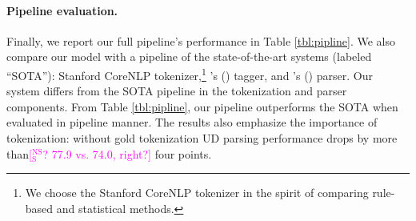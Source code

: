 \documentclass[11pt,a4paper]{article}
\newcommand{\citeposs}[2][]{\citeauthor{#2}'s (\citeyear[#1]{#2})}
\newcommand{\nss}[1]{\textcolor{magenta}{[$_\mathrm{S}^\mathrm{NS}$#1]}}
\begin{document}
\paragraph{Pipeline evaluation.} Finally, we report  our full
pipeline's performance in  Table \ref{tbl:pipline}. We also compare
our model with a pipeline of the state-of-the-art systems (labeled  ``SOTA''):
Stanford CoreNLP tokenizer,\footnote{We choose the Stanford CoreNLP tokenizer in the spirit of comparing 
rule-based and statistical methods.} %
\citeposs{owoputi-EtAl:2013:NAACL-HLT} tagger, and \citeposs{dozat-qi-manning:2017:K17-3} parser.
Our system differs from the SOTA pipeline in the tokenization and parser components.
From Table \ref{tbl:pipline}, our pipeline outperforms the SOTA when
evaluated in pipeline manner.
The results also emphasize the
importance of tokenization:  without gold tokenization
UD parsing
performance drops by more than\nss{? 77.9 vs. 74.0, right?} four points.
\end{document}
